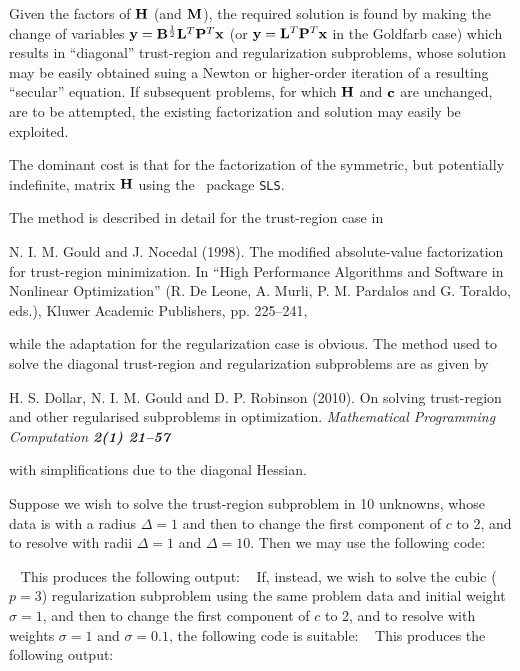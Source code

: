 \documentclass{galahad}
\begin{document}
Given the factors of ${\mathbf{H}}$ (and ${\mathbf{M}}$), the required solution is
found by making the change of variables ${\mathbf{y}} = {\mathbf{B}}^{{\scriptstyle \frac{1}{2}}} {\mathbf{L}}^T {\mathbf{P}}^T {\mathbf{x}}$
(or ${\mathbf{y}} = {\mathbf{L}}^T {\mathbf{P}}^T {\mathbf{x}}$ in the Goldfarb case)
which results in ``diagonal'' trust-region and regularization subproblems,
whose solution may be easily obtained suing a Newton or higher-order iteration
of a resulting ``secular'' equation.
If subsequent problems, for which
${\mathbf{H}}$ and ${\mathbf{c}}$ are unchanged, are to be attempted, the existing
factorization and solution may easily be exploited.

The dominant cost is that for the factorization of the symmetric, but
potentially indefinite, matrix ${\mathbf{H}}$ using the \galahad\ package {\tt SLS}.

\galreference

\noindent
The method is described in detail for the trust-region case in
\vspace*{1mm}

\noindent
N. I. M. Gould and J. Nocedal (1998).
The modified absolute-value factorization for trust-region minimization.
In ``High Performance Algorithms and Software in Nonlinear Optimization''
(R. De Leone, A. Murli, P. M. Pardalos and G. Toraldo, eds.),
Kluwer Academic Publishers, pp. 225--241,

\noindent
while the adaptation for the regularization case is obvious. The method used
to solve the diagonal trust-region and regularization subproblems are as
given by

\noindent
H. S. Dollar, N. I. M. Gould and D. P. Robinson (2010).
On solving trust-region and other regularised subproblems in optimization.
\em Mathematical Programming Computation \bf 2(1) \rm 21--57

\noindent
with simplifications due to the diagonal Hessian.


\galexample
Suppose we wish to solve the trust-region subproblem  in 10 unknowns,
whose data is
with a radius $\Delta = 1$
and then to change the first component of
$c$ to 2, and to resolve with radii $\Delta = 1$ and $\Delta = 10$.
Then we may use the following code:

{\tt \small
\VerbatimInput{\packageexample}
}
\noindent
This produces the following output:
{\tt \small
\VerbatimInput{\packageresults}
}
If, instead, we wish to solve the cubic ($p=3$) regularization subproblem
 using the same problem data and initial weight $\sigma = 1$,
and then to change the first component of $c$ to 2, and to resolve
with weights $\sigma = 1$ and $\sigma = 0.1$, the following code
is suitable:
{\tt \small
\VerbatimInput{\packageexampleb}
}
\noindent
This produces the following output:
{\tt \small
\VerbatimInput{\packageresultsb}
}
\end{document}
